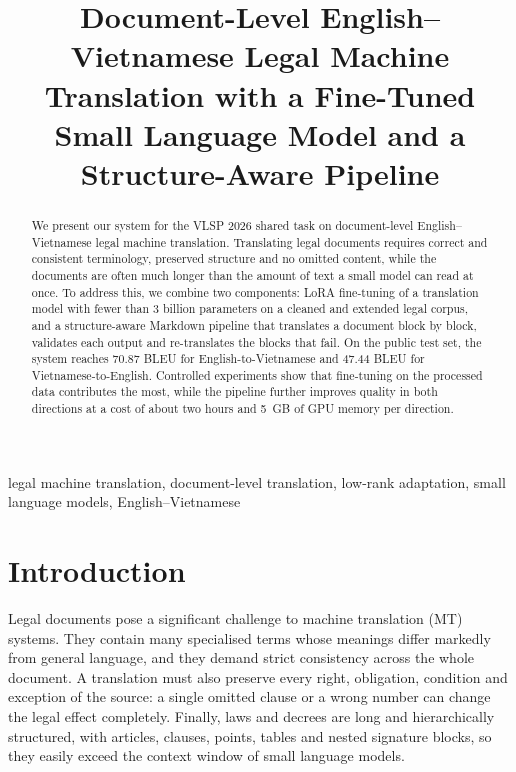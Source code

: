 \documentclass[conference]{IEEEtran}
\begin{document}
\title{Document-Level English--Vietnamese Legal Machine Translation with a Fine-Tuned Small Language Model and a Structure-Aware Pipeline}

\author{
}

\maketitle

\begin{abstract}
We present our system for the VLSP 2026 shared task on document-level English--Vietnamese legal machine translation. Translating legal documents requires correct and consistent terminology, preserved structure and no omitted content, while the documents are often much longer than the amount of text a small model can read at once. To address this, we combine two components: LoRA fine-tuning of a translation model with fewer than 3 billion parameters on a cleaned and extended legal corpus, and a structure-aware Markdown pipeline that translates a document block by block, validates each output and re-translates the blocks that fail. On the public test set, the system reaches 70.87 BLEU for English-to-Vietnamese and 47.44 BLEU for Vietnamese-to-English. Controlled experiments show that fine-tuning on the processed data contributes the most, while the pipeline further improves quality in both directions at a cost of about two hours and 5~GB of GPU memory per direction.
\end{abstract}

\begin{IEEEkeywords}
legal machine translation, document-level translation, low-rank adaptation, small language models, English--Vietnamese
\end{IEEEkeywords}

\section{Introduction}
Legal documents pose a significant challenge to machine translation (MT) systems. They contain many specialised terms whose meanings differ markedly from general language, and they demand strict consistency across the whole document. A translation must also preserve every right, obligation, condition and exception of the source: a single omitted clause or a wrong number can change the legal effect completely. Finally, laws and decrees are long and hierarchically structured, with articles, clauses, points, tables and nested signature blocks, so they easily exceed the context window of small language models.
\end{document}
